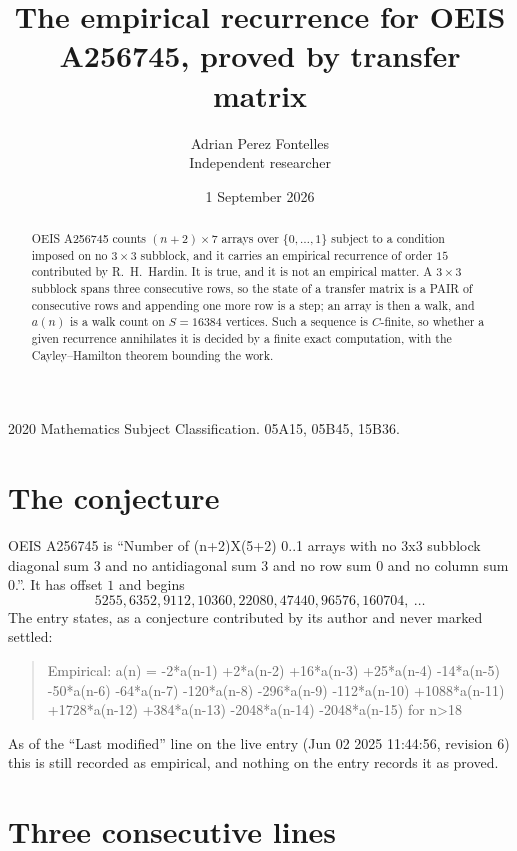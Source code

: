 \documentclass[11pt,a4paper]{article}
\title{The empirical recurrence for OEIS A256745, proved by transfer matrix}
\author{Adrian Perez Fontelles\\ \small Independent researcher}
\date{1 September 2026}
\theoremstyle{plain}
\theoremstyle{definition}
\begin{document}
\maketitle

\begin{abstract}
OEIS A256745 counts $(n+2)\times7$ arrays over $\{0,\dots,1\}$ subject to a condition imposed on
no $3\times3$ subblock, and it carries an empirical recurrence of order $15$
contributed by R.~H.~Hardin. It is true, and it is not an empirical matter. A $3\times3$
subblock spans three consecutive rows, so the state of a transfer matrix is a PAIR of
consecutive rows and appending one more row is a step; an array is then a walk, and
$a(n)$ is a walk count on $S=16384$ vertices. Such a sequence is $C$-finite, so whether a given
recurrence annihilates it is decided by a finite exact computation, with the Cayley--Hamilton
theorem bounding the work.
\end{abstract}

\noindent\small 2020 Mathematics Subject Classification. 05A15, 05B45, 15B36.\normalsize

\section{The conjecture}

OEIS A256745 is ``Number of (n+2)X(5+2) 0..1 arrays with no 3x3 subblock diagonal sum 3 and no antidiagonal sum 3 and no row sum 0 and no column sum 0.''. It has offset $1$ and begins
\[
5255, 6352, 9112, 10360, 22080, 47440, 96576, 160704,\ \dots
\]
The entry states, as a conjecture contributed by its author and never marked settled:
\begin{quote}
Empirical: a(n) = -2*a(n-1) +2*a(n-2) +16*a(n-3) +25*a(n-4) -14*a(n-5) -50*a(n-6) -64*a(n-7) -120*a(n-8) -296*a(n-9) -112*a(n-10) +1088*a(n-11) +1728*a(n-12) +384*a(n-13) -2048*a(n-14) -2048*a(n-15) for n>18
\end{quote}
As of the ``Last modified'' line on the live entry (Jun 02 2025 11:44:56, revision 6) this is still
recorded as empirical, and nothing on the entry records it as proved.

\section{Three consecutive lines}
\end{document}
